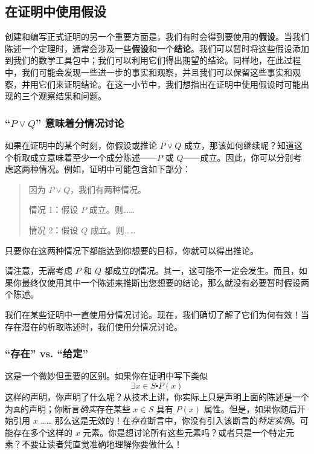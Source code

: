 \subsection{在证明中使用假设}\label{sec:section4.9.8}

创建和编写正式证明的另一个重要方面是，我们有时会得到要使用的\textbf{假设}。当我们陈述一个定理时，通常会涉及一些\textbf{假设}和一个\textbf{结论}。我们可以暂时将这些假设添加到我们的数学工具包中；我们可以利用它们得出期望的结论。同样地，在此过程中，我们可能会发现一些进一步的事实和观察，并且我们可以保留这些事实和观察，并用它们来证明结论。在这一小节中，我们想指出在证明中使用假设时可能出现的三个观察结果和问题。

\subsubsection*{``$P \lor Q$'' 意味着分情况讨论}

如果在证明中的某个时刻，你假设或推论 $P \lor Q$ 成立，那该如何继续呢？知道这个析取成立意味着至少一个成分陈述——$P$ 或 $Q$——成立。因此，你可以分别考虑这两种情况。例如，证明中可能包含如下部分：
\begin{quote}
    因为 $P \lor Q$，我们有两种情况。

    \qquad 情况 1：假设 $P$ 成立。则……

    \qquad 情况 2：假设 $Q$ 成立。则……
\end{quote}
只要你在这两种情况下都能达到你想要的目标，你就可以得出推论。

请注意，无需考虑 $P$ 和 $Q$ 都成立的情况。其一，这可能不一定会发生。而且，如果你最终仅使用其中一个陈述来推断出您想要的结论，那么就没有必要暂时假设两个陈述。

我们在某些证明中一直使用分情况讨论。现在，我们确切了解了它们为何有效！当存在潜在的析取陈述时，我们使用分情况讨论。

\subsubsection*{``存在'' vs. ``给定''}

这是一个微妙但重要的区别。如果你在证明中写下类似
\[\exists x \in S \centerdot P(x)\]
这样的声明，你声明了什么呢？从技术上讲，你实际上只是声明上面的陈述是一个为\verb|真|的声明；你断言\emph{确实}存在某些 $x \in S$ 具有 $P(x)$ 属性。但是，如果你随后开始引用 $x$ …… 那么这是无效的！在\emph{存在}断言中，你没有引入该断言的\emph{特定实例}。可能存在多个这样的 $x$ 元素。你是想讨论所有这些元素吗？或者只是一个特定元素？不要让读者凭直觉准确地理解你要做什么！

